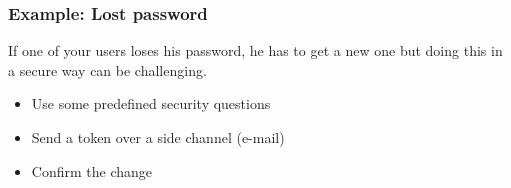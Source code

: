 \begin{frame}
\frametitle{Example: Lost password}
If one of your users loses his password, he has to get a new one but doing
this in a secure way can be challenging.
\begin{itemize}
\item Use some predefined security questions
\item Send a token over a side channel \small{(e-mail)}
\item Confirm the change
\end{itemize}
\end{frame}

